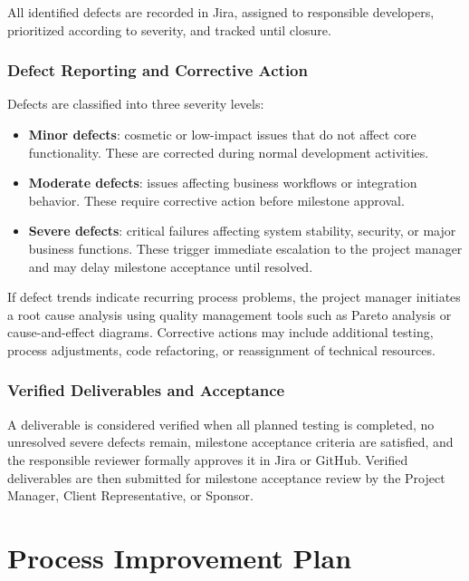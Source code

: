 \documentclass[12pt,a4paper]{article}
\begin{document}
All identified defects are recorded in Jira, assigned to responsible developers, prioritized according to severity, and tracked until closure.

\subsubsection{Defect Reporting and Corrective Action}

Defects are classified into three severity levels:

\begin{itemize}[leftmargin=*]
    \item \textbf{Minor defects}: cosmetic or low-impact issues that do not affect core functionality. These are corrected during normal development activities.
    \item \textbf{Moderate defects}: issues affecting business workflows or integration behavior. These require corrective action before milestone approval.
    \item \textbf{Severe defects}: critical failures affecting system stability, security, or major business functions. These trigger immediate escalation to the project manager and may delay milestone acceptance until resolved.
\end{itemize}

If defect trends indicate recurring process problems, the project manager initiates a root cause analysis using quality management tools such as Pareto analysis or cause-and-effect diagrams. Corrective actions may include additional testing, process adjustments, code refactoring, or reassignment of technical resources.

\subsubsection{Verified Deliverables and Acceptance}

A deliverable is considered verified when all planned testing is completed, no unresolved severe defects remain, milestone acceptance criteria are satisfied, and the responsible reviewer formally approves it in Jira or GitHub. Verified deliverables are then submitted for milestone acceptance review by the Project Manager, Client Representative, or Sponsor.
\clearpage
\section{Process Improvement Plan}
\end{document}
